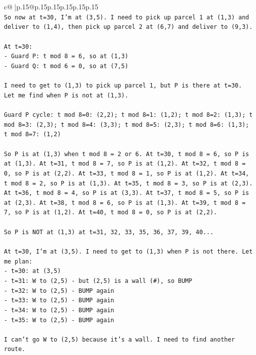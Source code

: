 \documentclass{article}
\begin{document}
{\begin{supertabular}{c@{$\;$}|p{.15\linewidth}@{}p{.15\linewidth}p{.15\linewidth}p{.15\linewidth}p{.15\linewidth}p{.15\linewidth}}
{{{\\ 
\texttt{So now at t=30, I'm at (3,5). I need to pick up parcel 1 at (1,3) and deliver to (1,4), then pick up parcel 2 at (6,7) and deliver to (9,3).} \\
\\ 
\texttt{At t=30:} \\
\texttt{{-} Guard P: t mod 8 = 6, so at (1,3)} \\
\texttt{{-} Guard Q: t mod 6 = 0, so at (7,5)} \\
\\ 
\texttt{I need to get to (1,3) to pick up parcel 1, but P is there at t=30. Let me find when P is not at (1,3).} \\
\\ 
\texttt{Guard P cycle: t mod 8=0: (2,2); t mod 8=1: (1,2); t mod 8=2: (1,3); t mod 8=3: (2,3); t mod 8=4: (3,3); t mod 8=5: (2,3); t mod 8=6: (1,3); t mod 8=7: (1,2)} \\
\\ 
\texttt{So P is at (1,3) when t mod 8 = 2 or 6. At t=30, t mod 8 = 6, so P is at (1,3). At t=31, t mod 8 = 7, so P is at (1,2). At t=32, t mod 8 = 0, so P is at (2,2). At t=33, t mod 8 = 1, so P is at (1,2). At t=34, t mod 8 = 2, so P is at (1,3). At t=35, t mod 8 = 3, so P is at (2,3). At t=36, t mod 8 = 4, so P is at (3,3). At t=37, t mod 8 = 5, so P is at (2,3). At t=38, t mod 8 = 6, so P is at (1,3). At t=39, t mod 8 = 7, so P is at (1,2). At t=40, t mod 8 = 0, so P is at (2,2).} \\
\\ 
\texttt{So P is NOT at (1,3) at t=31, 32, 33, 35, 36, 37, 39, 40...} \\
\\ 
\texttt{At t=30, I'm at (3,5). I need to get to (1,3) when P is not there. Let me plan:} \\
\texttt{{-} t=30: at (3,5)} \\
\texttt{{-} t=31: W to (2,5) {-} but (2,5) is a wall (\#), so BUMP} \\
\texttt{{-} t=32: W to (2,5) {-} BUMP again} \\
\texttt{{-} t=33: W to (2,5) {-} BUMP again} \\
\texttt{{-} t=34: W to (2,5) {-} BUMP again} \\
\texttt{{-} t=35: W to (2,5) {-} BUMP again} \\
\\ 
\texttt{I can't go W to (2,5) because it's a wall. I need to find another route.} \\
\\ 
}}}
\end{supertabular}}
\end{document}
